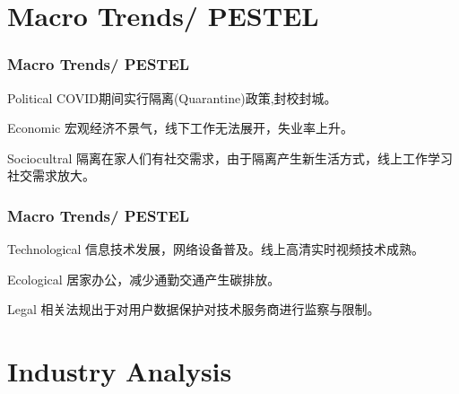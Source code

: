 \documentclass{beamer}
\begin{document}


\section{Macro Trends/ PESTEL}
\begin{frame}
\frametitle{Macro Trends/ PESTEL}

\begin{block}{Political}
COVID期间实行隔离(Quarantine)政策,封校封城。
\end{block}

\begin{block}{Economic}
宏观经济不景气，线下工作无法展开，失业率上升。
\end{block}

\begin{block}{Sociocultral}
隔离在家人们有社交需求，由于隔离产生新生活方式，线上工作学习社交需求放大。
\end{block}
\end{frame}
\begin{frame}
\frametitle{Macro Trends/ PESTEL}
\begin{block}{Technological}
信息技术发展，网络设备普及。线上高清实时视频技术成熟。
\end{block}
\begin{block}{Ecological}
居家办公，减少通勤交通产生碳排放。
\end{block}
\begin{block}{Legal}
相关法规出于对用户数据保护对技术服务商进行监察与限制。
\end{block}
\end{frame}

\section{Industry Analysis}
\end{document}
